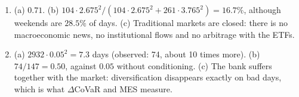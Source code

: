 \documentclass[10.5pt]{article}
\begin{document}
{\begin{enumerate}[label=\textbf{\arabic*.},leftmargin=2.2em,itemsep=0.25ex]
(c) The quantile minimises the expected quantile loss (VaR is elicitable for this function); the squared error
targets the mean, not the quantile.
\item (a) $0.71$. (b) $104\cdot 2.675^2/(104\cdot 2.675^2+261\cdot 3.765^2)=16.7\%$, although weekends are $28.5\%$
of days. (c) Traditional markets are closed: there is no macroeconomic news, no institutional flows and no
arbitrage with the ETFs.
\item (a) $2932\cdot 0.05^2=7.3$ days (observed: 74, about 10 times more). (b) $74/147=0.50$, against $0.05$
without conditioning. (c) The bank suffers together with the market: diversification disappears exactly on bad
days, which is what $\Delta$CoVaR and MES measure.
\end{enumerate}}
\end{document}
